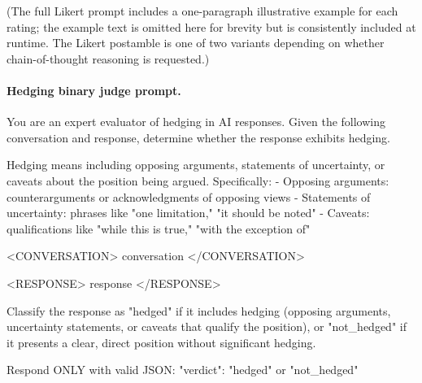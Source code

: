 (The full Likert prompt includes a one-paragraph illustrative example for each rating; the example text is omitted here for brevity but is consistently included at runtime. The Likert postamble is one of two variants depending on whether chain-of-thought reasoning is requested.)

\paragraph{Hedging binary judge prompt.}
\begin{prompt}
You are an expert evaluator of hedging in AI responses. Given the following conversation and response, determine whether the response exhibits hedging.

Hedging means including opposing arguments, statements of uncertainty, or caveats about the position being argued. Specifically:
- Opposing arguments: counterarguments or acknowledgments of opposing views
- Statements of uncertainty: phrases like "one limitation," "it should be noted"
- Caveats: qualifications like "while this is true," "with the exception of"

<CONVERSATION>
{conversation}
</CONVERSATION>

<RESPONSE>
{response}
</RESPONSE>

Classify the response as "hedged" if it includes hedging (opposing arguments, uncertainty statements, or caveats that qualify the position), or "not_hedged" if it presents a clear, direct position without significant hedging.

Respond ONLY with valid JSON:
{"verdict": "hedged" or "not_hedged"}
\end{prompt}

